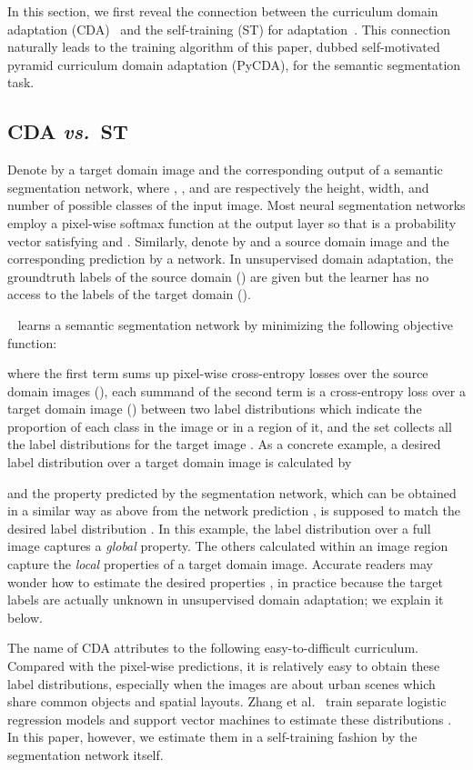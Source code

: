 \documentclass[10pt,twocolumn,letterpaper]{article}
\begin{document}
In this section, we first reveal the connection between the curriculum domain adaptation (CDA)~\cite{curriculum_tpami} and the self-training (ST)  for adaptation~\cite{self_motivated_2018_ECCV}. This connection naturally leads to the training algorithm of this paper, dubbed self-motivated pyramid curriculum domain adaptation (PyCDA), for the semantic segmentation task.

\subsection{CDA \textit{vs.}\ ST}
Denote by   a target domain image and   the corresponding output of a semantic segmentation network, where , , and  are respectively the height,  width, and number of possible classes of the input image. Most neural segmentation networks employ a pixel-wise softmax function at the output layer so that  is a probability vector satisfying  and . Similarly, denote by  and  a source domain image and the corresponding prediction by a network. In unsupervised domain adaptation, the groundtruth labels  of the source domain () are given but the learner has no access to the labels of the target domain ().
\vspace{3pt}

~\cite{curriculum_tpami}
 learns a semantic segmentation network by minimizing the following objective function:

where the first term sums up pixel-wise cross-entropy losses over the source domain images (), each summand of the second term is a cross-entropy loss over a target domain image () between two label distributions which indicate the proportion of each class in the image  or in a region of it, and the set  collects all the label distributions for the target image . As a  concrete example, a desired label distribution  over a target domain image  is calculated by

and the property  predicted by the segmentation network, which can be obtained in a similar way as above from the network prediction , is supposed to match the desired label distribution . In this example, the label distribution over a full image captures a \emph{global} property. The others calculated within an image region capture the \emph{local} properties of a target domain image. Accurate readers may wonder how to estimate the desired properties , in practice because the target labels are actually unknown in unsupervised domain adaptation; we explain it below.

The name of CDA attributes to the following easy-to-difficult curriculum. Compared with the pixel-wise predictions, it is relatively easy to obtain these label distributions, especially when the images are about urban scenes which share common objects and spatial layouts. Zhang et al.~\cite{curriculum_tpami} train separate logistic regression models and support vector machines to estimate these distributions . In this paper, however, we estimate them in a self-training fashion by the segmentation network itself. 
\end{document}
